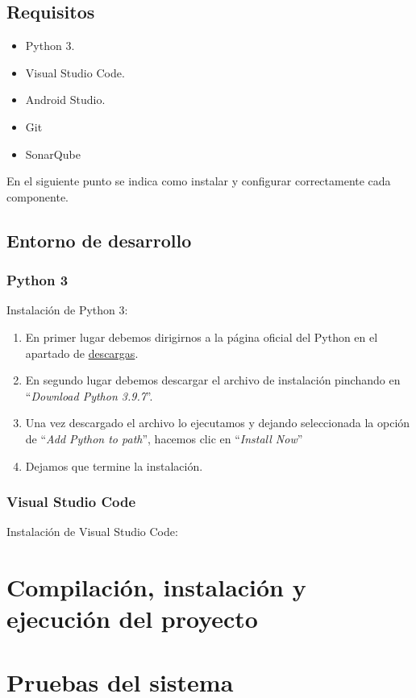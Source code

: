 \subsection{Requisitos}

\begin{itemize}
\item
	Python 3.
\item
	Visual Studio Code.
\item
	Android Studio.
\item
	Git
\item
	SonarQube
\end{itemize}

En el siguiente punto se indica como instalar y configurar correctamente cada componente.


\subsection{Entorno de desarrollo}

\subsubsection{Python 3}

Instalación de Python 3:
\begin{enumerate}
\item
	En primer lugar debemos dirigirnos a la página oficial del Python en el apartado de \href{https://www.python.org/downloads/}{descargas}.
\item
	En segundo lugar debemos descargar el archivo de instalación pinchando en ``\textit{Download Python 3.9.7}''.
\item
	Una vez descargado el archivo lo ejecutamos y dejando seleccionada la opción de ``\textit{Add Python to path}'', hacemos clic en ``\textit{Install Now}''
\item
	Dejamos que termine la instalación.
\end{enumerate}

\subsubsection{Visual Studio Code}

Instalación de Visual Studio Code:



\section{Compilación, instalación y ejecución del proyecto}

\section{Pruebas del sistema}
